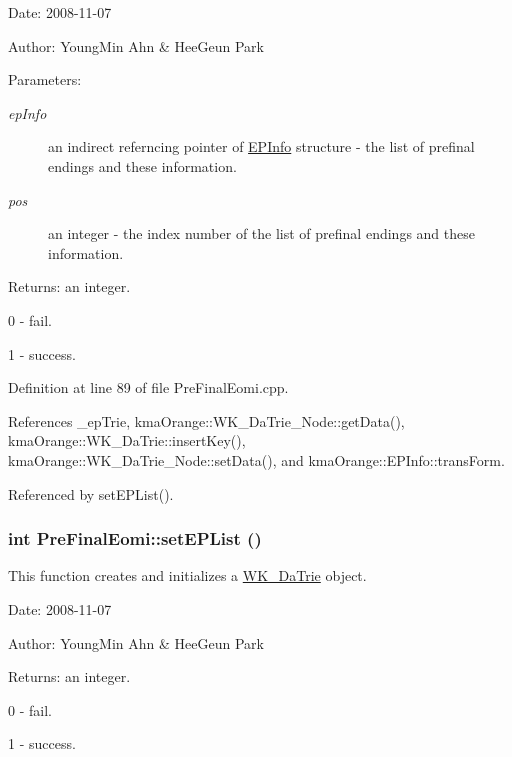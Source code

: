 \begin{Desc}
\item[Date:]2008-11-07 \end{Desc}
\begin{Desc}
\item[Author:]YoungMin Ahn \& HeeGeun Park \end{Desc}
\begin{Desc}
\item[Parameters:]
\begin{description}
\item[{\em epInfo}]an indirect referncing pointer of \hyperlink{structkmaOrange_1_1EPInfo}{EPInfo} structure - the list of prefinal endings and these information. \item[{\em pos}]an integer - the index number of the list of prefinal endings and these information. \end{description}
\end{Desc}
\begin{Desc}
\item[Returns:]an integer.\par
 0 - fail.\par
 1 - success. \end{Desc}


Definition at line 89 of file PreFinalEomi.cpp.

References \_\-epTrie, kmaOrange::WK\_\-DaTrie\_\-Node::getData(), kmaOrange::WK\_\-DaTrie::insertKey(), kmaOrange::WK\_\-DaTrie\_\-Node::setData(), and kmaOrange::EPInfo::transForm.

Referenced by setEPList().\hypertarget{classkmaOrange_1_1PreFinalEomi_02183bcf01f69f0f246a9c6311df4447}{
\subsubsection[{setEPList}]{\setlength{\rightskip}{0pt plus 5cm}int PreFinalEomi::setEPList ()}}
\label{classkmaOrange_1_1PreFinalEomi_02183bcf01f69f0f246a9c6311df4447}


This function creates and initializes a \hyperlink{classkmaOrange_1_1WK__DaTrie}{WK\_\-DaTrie} object. 

\begin{Desc}
\item[Date:]2008-11-07 \end{Desc}
\begin{Desc}
\item[Author:]YoungMin Ahn \& HeeGeun Park \end{Desc}
\begin{Desc}
\item[Returns:]an integer.\par
 0 - fail.\par
 1 - success. \end{Desc}


